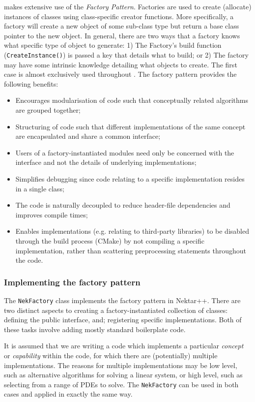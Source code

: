 {\nek} makes extensive use of the \emph{Factory Pattern}.
Factories are used to create (allocate) instances of classes using class-specific creator functions. More
specifically, a factory will create a new object of some
sub-class type but return a base class pointer to the new
object. In general, there are two ways that a factory knows what
specific type of object to generate: 1) The Factory's build
function (\lstinline{CreateInstance()}) is
passed a key that details what to build; or 2) The factory may
have some intrinsic knowledge detailing what objects to create. The first case is almost exclusively used throughout {\nek}.
The factory pattern provides the following benefits:
\begin{itemize}
\item Encourages modularisation of code such that conceptually related
algorithms are grouped together;
\item Structuring of code such that different implementations of the same
concept are encapsulated and share a common interface;
\item Users of a factory-instantiated modules need only be concerned with the
 interface and not the details of underlying implementations;
\item Simplifies debugging since code relating to a specific implementation
 resides in a single class;
\item The code is naturally decoupled to reduce header-file dependencies and
 improves compile times;
\item Enables implementations (e.g. relating to third-party libraries) to be
 disabled through the build process (CMake) by not compiling a specific 
 implementation, rather than scattering preprocessing statements throughout the
 code.
\end{itemize}


\subsubsection{Implementing the factory pattern}
The \lstinline{NekFactory} class implements the factory pattern in Nektar++.
There are two distinct aspects to creating a factory-instantiated collection of
classes: defining the public interface, and; registering specific
implementations. Both of these tasks involve adding mostly standard boilerplate code.

It is assumed that we are writing a code which implements a particular \emph{concept} or
\emph{capability} within the code, for which there are (potentially) multiple implementations. The
reasons for multiple implementations may be low level, such as alternative
algorithms for solving a linear system, or high level, such as selecting from a
range of PDEs to solve. The \lstinline{NekFactory} can be used in both cases and applied in exactly the same way.

